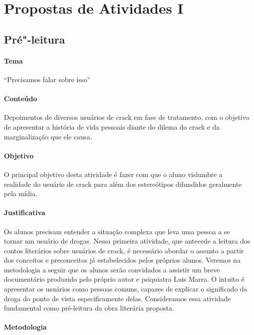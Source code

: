 \documentclass[12pt]{extarticle}
\begin{document}
\tableofcontents


\section{Propostas de Atividades I}

\subsection{Pré"-leitura}

\paragraph{Tema} ``Precisamos falar sobre isso'' 

\paragraph{Conteúdo} Depoimentos de diversos usuários de crack em 
fase de tratamento, com o objetivo de apresentar a história de 
vida pessoais diante do dilema do crack e da marginalização que ele causa. 

\paragraph{Objetivo} O principal objetivo desta atividade 
é fazer com que o aluno vislumbre a realidade do usuário de 
crack para além dos estereótipos difundidos geralmente 
pela mídia. 

\paragraph{Justificativa} Os alunos precisam 
entender a situação complexa que leva uma pessoa a se tornar um usuário de drogas. 
Nessa primeira atividade, 
que antecede a leitura dos contos literários sobre usuários de crack, 
é necessário abordar o assunto a partir dos conceitos e
preconceitos já estabelecidos pelos próprios alunos. 
Veremos na metodologia a seguir que os alunos serão 
convidados a assistir um breve documentário produzido pelo 
próprio autor e psiquiatra Luis Marra. O intuito é apresentar 
os usuários como pessoas comuns, capazes de explicar o significado da droga 
do ponto de vista especificamente delas. Consideramos essa 
atividade fundamental como pré-leitura da obra literária proposta.

\paragraph{Metodologia}
	
\end{document}
